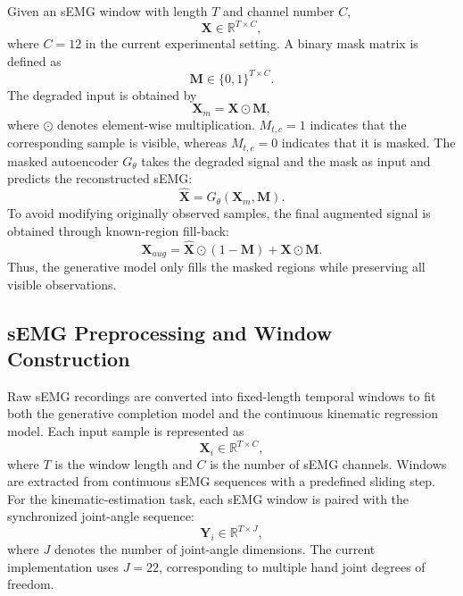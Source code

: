 \documentclass[journal]{IEEEtran}
\begin{document}
Given an sEMG window with length $T$ and channel number $C$,
\begin{equation}
\mathbf{X} \in \mathbb{R}^{T \times C},
\end{equation}
where $C=12$ in the current experimental setting. A binary mask matrix is defined as
\begin{equation}
\mathbf{M} \in \{0,1\}^{T \times C}.
\end{equation}
The degraded input is obtained by
\begin{equation}
\mathbf{X}_{m} = \mathbf{X} \odot \mathbf{M},
\end{equation}
where $\odot$ denotes element-wise multiplication. $M_{t,c}=1$ indicates that the corresponding sample is visible, whereas $M_{t,c}=0$ indicates that it is masked. The masked autoencoder $G_{\theta}$ takes the degraded signal and the mask as input and predicts the reconstructed sEMG:
\begin{equation}
\hat{\mathbf{X}} = G_{\theta}(\mathbf{X}_{m}, \mathbf{M}).
\end{equation}
To avoid modifying originally observed samples, the final augmented signal is obtained through known-region fill-back:
\begin{equation}
\mathbf{X}_{aug} = \hat{\mathbf{X}} \odot (1-\mathbf{M}) + \mathbf{X} \odot \mathbf{M}.
\end{equation}
Thus, the generative model only fills the masked regions while preserving all visible observations.

\subsection{sEMG Preprocessing and Window Construction}
Raw sEMG recordings are converted into fixed-length temporal windows to fit both the generative completion model and the continuous kinematic regression model. Each input sample is represented as
\begin{equation}
\mathbf{X}_i \in \mathbb{R}^{T \times C},
\end{equation}
where $T$ is the window length and $C$ is the number of sEMG channels. Windows are extracted from continuous sEMG sequences with a predefined sliding step. For the kinematic-estimation task, each sEMG window is paired with the synchronized joint-angle sequence:
\begin{equation}
\mathbf{Y}_i \in \mathbb{R}^{T \times J},
\end{equation}
where $J$ denotes the number of joint-angle dimensions. The current implementation uses $J=22$, corresponding to multiple hand joint degrees of freedom.
\end{document}
